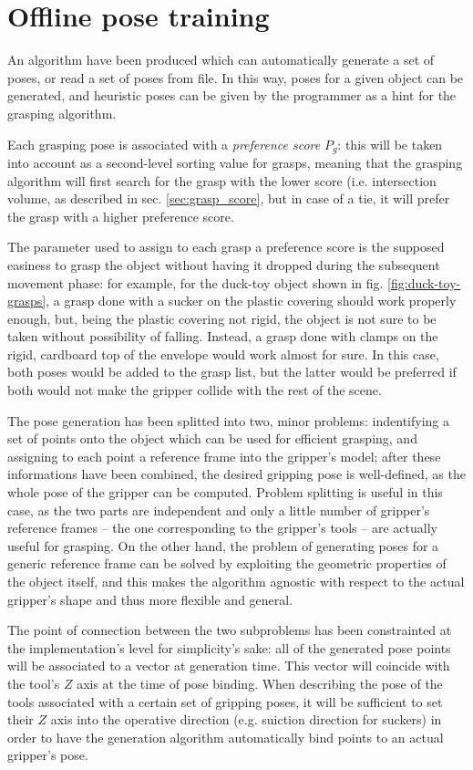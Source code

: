 \section{Offline pose training} \label{sec:pose-generation}
An algorithm have been produced which can automatically generate a set of
poses, or read a set of poses from file. In this way, poses for a given object
can be generated, and heuristic poses can be given by the programmer as a hint
for the grasping algorithm.  

Each grasping pose is associated with a \emph{preference score} $P_{g}$: this will be taken
into account as a second-level sorting value for grasps, meaning that the
grasping algorithm will first search for the grasp with the lower score (i.e.
intersection volume, as described in sec. \ref{sec:grasp_score}, but in case of
a tie, it will prefer the grasp with a higher preference score.

The parameter used to assign to each grasp a preference score is the supposed
easiness to grasp the object without having it dropped during the subsequent
movement phase: for example, for the duck-toy object shown in fig.
\ref{fig:duck-toy-grasps}, a grasp done with a sucker on the plastic covering
should work properly enough, but, being the plastic covering not rigid, the
object is not sure to be taken without possibility of falling. Instead, a grasp
done with clamps on the rigid, cardboard top of the envelope would work almost
for sure. In this case, both poses would be added to the grasp list, but the
latter would be preferred if both would not make the gripper collide with the
rest of the scene.

The pose generation has been splitted into two, minor problems: indentifying a
set of points onto the object which can be used for efficient grasping, and
assigning to each point a reference frame into the gripper's model; after these
informations have been combined, the desired gripping pose is well-defined, as the
whole pose of the gripper can be computed. Problem splitting is useful in this
case, as the two parts are independent and only a little number of gripper's
reference frames -- the one corresponding to the gripper's tools -- are actually
useful for grasping. On the other hand, the problem of  generating poses for a generic
reference frame can be solved by exploiting the geometric properties of the
object itself, and this makes the algorithm agnostic with respect to the actual
gripper's shape and thus more flexible and general.

The point of connection between the two subproblems has been constrainted at the
implementation's level for simplicity's sake: all of the generated pose
points will be associated to a vector at generation time. This vector will
coincide with the tool's $Z$ axis at the time of pose binding. When describing
the pose of the tools associated with a certain set of gripping poses, it will
be sufficient to set their $Z$ axis into the operative direction (e.g. suiction
direction for suckers) in order to have the generation algorithm automatically
bind points to an actual gripper's pose.

